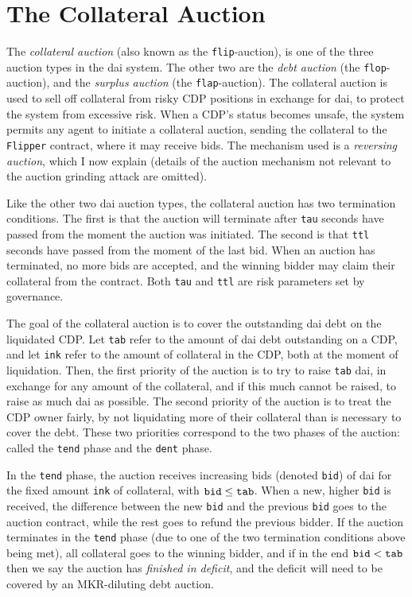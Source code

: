\documentclass[a4paper,10pt]{article}
\begin{document}
\section{The Collateral Auction}
The \emph{collateral auction} (also known as the {\tt flip}-auction), is one of the three auction types in the dai system. The other two are the \emph{debt auction} (the {\tt flop}-auction), and the \emph{surplus auction} (the {\tt flap}-auction). The collateral auction is used to sell off collateral from risky CDP positions in exchange for dai, to protect the system from excessive risk. When a CDP's status becomes unsafe, the system permits any agent to initiate a collateral auction, sending the collateral to the {\tt Flipper} contract, where it may receive bids. The mechanism used is a \emph{reversing auction}, which I now explain (details of the auction mechanism not relevant to the auction grinding attack are omitted).
\par Like the other two dai auction types, the collateral auction has two termination conditions. The first is that the auction will terminate after {\tt tau} seconds have passed from the moment the auction was initiated. The second is that {\tt ttl} seconds have passed from the moment of the last bid. When an auction has terminated, no more bids are accepted, and the winning bidder may claim their collateral from the contract. Both {\tt tau} and {\tt ttl} are risk parameters set by governance.
\par The goal of the collateral auction is to cover the outstanding dai debt on the liquidated CDP. Let {\tt tab} refer to the amount of dai debt outstanding on a CDP, and let {\tt ink} refer to the amount of collateral in the CDP, both at the moment of liquidation. Then, the first priority of the auction is to try to raise {\tt tab} dai, in exchange for any amount of the collateral, and if this much cannot be raised, to raise as much dai as possible.  The second priority of the auction is to treat the CDP owner fairly, by not liquidating more of their collateral than is necessary to cover the debt. These two priorities correspond to the two phases of the auction: called the {\tt tend} phase and the {\tt dent} phase.
\par In the {\tt tend} phase, the auction receives increasing bids (denoted {\tt bid}) of dai for the fixed amount {\tt ink} of collateral, with ${\tt bid} \leq {\tt tab}$. When a new, higher {\tt bid} is received, the difference between the new {\tt bid} and the previous {\tt bid} goes to the auction contract, while the rest goes to refund the previous bidder. If the auction terminates in the {\tt tend} phase (due to one of the two termination conditions above being met), all collateral goes to the winning bidder, and if in the end ${\tt bid} < {\tt tab}$ then we say the auction has \emph{finished in deficit}, and the deficit will need to be covered by an MKR-diluting debt auction.
\end{document}
